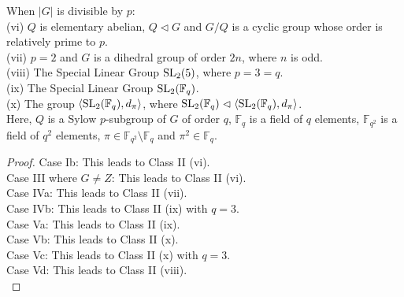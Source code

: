 \begin{theorem}[Class II]
    \label{dicksons_classification_theorem_class_II}
    \leanok
    When $|G|$ is divisible by $p$: \vspace{1mm} \\
(vi) $Q$ is elementary abelian, $Q \vartriangleleft G$ and $G/Q$ is a cyclic group whose order is relatively prime to $p$. \vspace{3mm} \\
(vii) $p=2$ and $G$ is a dihedral group of order $2n$, where $n$ is odd. \vspace{3mm} \\
(viii) The Special Linear Group $\operatorname{SL}_2(5)$, where $p=3=q$. \vspace{3mm} \\
(ix) The Special Linear Group $\operatorname{SL}_2(\mathbb{F}_q)$. \vspace{3mm} \\
(x) The group $\langle \operatorname{SL}_2(\mathbb{F}_q), d_\pi \rangle$, where $\operatorname{SL}_2(\mathbb{F}_q) \vartriangleleft \langle \operatorname{SL}_2(\mathbb{F}_q), d_\pi \rangle$. \vspace{3mm} \\

Here, $Q$ is a Sylow $p$-subgroup of $G$ of order $q$, $\mathbb{F}_q$ is a field of $q$ elements, $\mathbb{F}_{q^2}$ is a field of $q^2$ elements, $\pi \in \mathbb{F}_{q^2} \setminus \mathbb{F}_q$ and $\pi^2 \in \mathbb{F}_q$. \vspace{3mm}
\end{theorem}

\begin{proof}

Case Ib: This leads to Class II (vi). \\
Case III where $G \ne Z$: This leads to Class II (vi). \\
Case IVa: This leads to Class II (vii). \\
Case IVb: This leads to Class II (ix) with $q=3$. \\
Case Va: This leads to Class II (ix). \\
Case Vb: This leads to Class II (x). \\
Case Vc: This leads to Class II (x) with $q=3$. \\
Case Vd: This leads to Class II (viii). \\
\end{proof}


